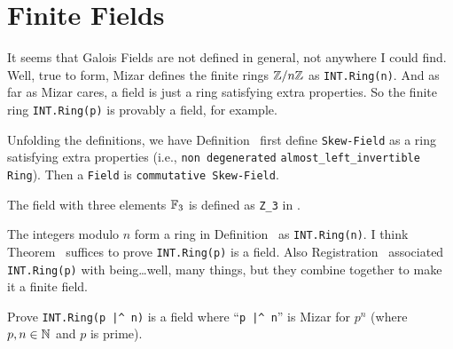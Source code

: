 \section{Finite Fields}

It seems that Galois Fields are not defined in
general, not anywhere I could find. Well, true to form, Mizar defines
the finite rings $\ZZ/n\ZZ$ as \lstinline{INT.Ring(n)}. And as far as
Mizar cares, a field is just a ring satisfying extra properties. So the
finite ring \lstinline{INT.Ring(p)} is provably a field, for example.

Unfolding the definitions, we have Definition~
first define \lstinline{Skew-Field} as a ring satisfying extra properties
(i.e., \lstinline{non degenerated} \lstinline{almost_left_invertible} \lstinline{Ring}).
Then a \lstinline{Field} is \lstinline{commutative Skew-Field}.

\begin{example}[{$\FF_{3}$}]
The field with three elements $\FF_{3}$ is defined as \lstinline!Z_3!
in .
\end{example}

\begin{example}[{$\ZZ/n\ZZ$}]
The integers modulo $n$ form a ring in Definition~ as
\lstinline{INT.Ring(n)}. I think Theorem~ suffices to
prove \lstinline{INT.Ring(p)} is a field. Also Registration~
associated \lstinline{INT.Ring(p)} with being\dots well, many things,
but they combine together to make it a finite field.
\end{example}

\begin{exercise}
Prove \lstinline{INT.Ring(p |^ n)} is a field where ``\lstinline{p |^ n}''
is Mizar for $p^{n}$ (where $p,n\in\mathbb{N}$ and $p$ is prime).
\end{exercise}
